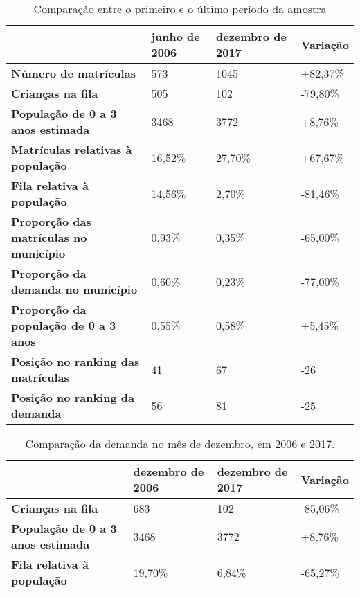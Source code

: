\documentclass[12pt, a4]{book}
\begin{document}
\begin{table}[H]
	\begin{tabular}{|l|l|l|l|}
		\hline
		\textbf{}                                                  & \textbf{junho de 2006} & \textbf{dezembro de 2017} & \textbf{Variação} \\ \hline
		\textbf{Número de matrículas}                              & 573                    & 1045                      & +82,37\%          \\ \hline
		\textbf{Crianças na fila}                                  & 505                    & 102                       & -79,80\%          \\ \hline
		\textbf{População de 0 a 3 anos estimada}                  & 3468                   & 3772                      & +8,76\%           \\ \hline
		\textbf{Matrículas relativas à população}                  & 16,52\%                & 27,70\%                   & +67,67\%          \\ \hline
		\textbf{Fila relativa à população}                         & 14,56\%                & 2,70\%                    & -81,46\%          \\ \hline
		\textbf{Proporção das matrículas no município}             & 0,93\%                 & 0,35\%                    & -65,00\%          \\ \hline
		\textbf{Proporção da demanda no município}                 & 0,60\%                 & 0,23\%                    & -77,00\%          \\ \hline
		\textbf{Proporção da população de 0 a 3 anos} & 0,55\%                 & 0,58\%                    & +5,45\%           \\ \hline
		\textbf{Posição no ranking das matrículas}                 & 41                     & 67                        & -26               \\ \hline
		\textbf{Posição no ranking da demanda}                     & 56                     & 81                        & -25               \\ \hline
	\end{tabular}
	\caption{Comparação entre o primeiro e o último período da amostra}
\end{table}

\begin{table}[H]
	\begin{tabular}{|l|l|l|l|}
		\hline
		\textbf{}                                 & \textbf{dezembro de 2006} & \textbf{dezembro de 2017} & \textbf{Variação} \\ \hline
		\textbf{Crianças na fila}                 & 683                    & 102                       & -85,06\%          \\ \hline
		\textbf{População de 0 a 3 anos estimada} & 3468                & 3772                      & +8,76\%           \\ \hline
		\textbf{Fila relativa à população}        & 19,70\%             & 6,84\%                  & -65,27\%        \\ \hline
	\end{tabular}
	\caption{Comparação da demanda no mês de dezembro, em 2006 e 2017.}
	\label{tab:demanda}
\end{table}
\end{document}
